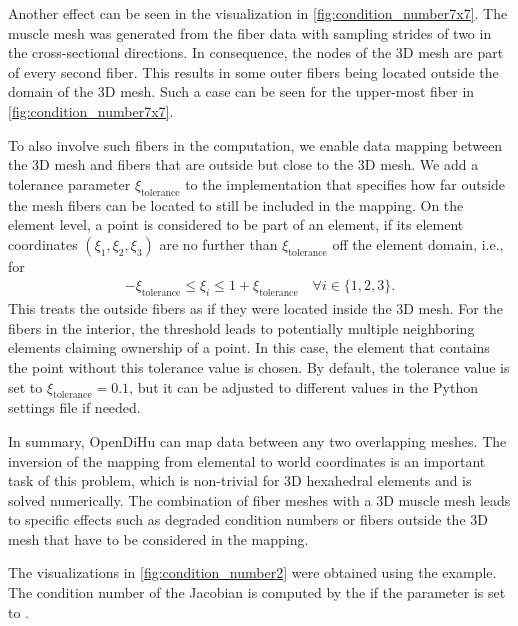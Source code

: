 Another effect can be seen in the visualization in \cref{fig:condition_number7x7}. The muscle mesh was generated from the fiber data with sampling strides of two in the cross-sectional directions. In consequence, the nodes of the 3D mesh are part of every second fiber. This results in some outer fibers being located outside the domain of the 3D mesh. Such a case can be seen for the upper-most fiber in \cref{fig:condition_number7x7}. 

To also involve such fibers in the computation, we enable data mapping between the 3D mesh and fibers that are outside but close to the 3D mesh. We add a tolerance parameter $\xi_\text{tolerance}$ to the implementation that specifies how far outside the mesh fibers can be located to still be included in the mapping. On the element level, a point is considered to be part of an element, if its element coordinates $(\xi_1,\xi_2,\xi_3)$ are no further than $\xi_\text{tolerance}$ off the element domain, i.e., for %
\begin{align*}
  -\xi_\text{tolerance} \leq \xi_i \leq 1 + \xi_\text{tolerance}\quad \forall i \in \{1,2,3\}.
\end{align*}
This treats the outside fibers as if they were located inside the 3D mesh. For the fibers in the interior, the threshold leads to potentially multiple neighboring elements claiming ownership of a point. In this case, the element that contains the point without this tolerance value is chosen.
By default, the tolerance value is set to $\xi_\text{tolerance}=0.1$, but it can be adjusted to different values in the Python settings file if needed.

In summary, OpenDiHu can map data between any two overlapping meshes. The inversion of the mapping from elemental to world coordinates is an important task of this problem, which is non-trivial for 3D hexahedral elements and is solved numerically. The combination of fiber meshes with a 3D muscle mesh leads to specific effects such as degraded condition numbers or fibers outside the 3D mesh that have to be considered in the mapping.

\begin{reproduce_no_break}
  The visualizations in \cref{fig:condition_number2} were obtained using the  example. The condition number of the Jacobian is computed by the  if the parameter  is set to .
\end{reproduce_no_break}
